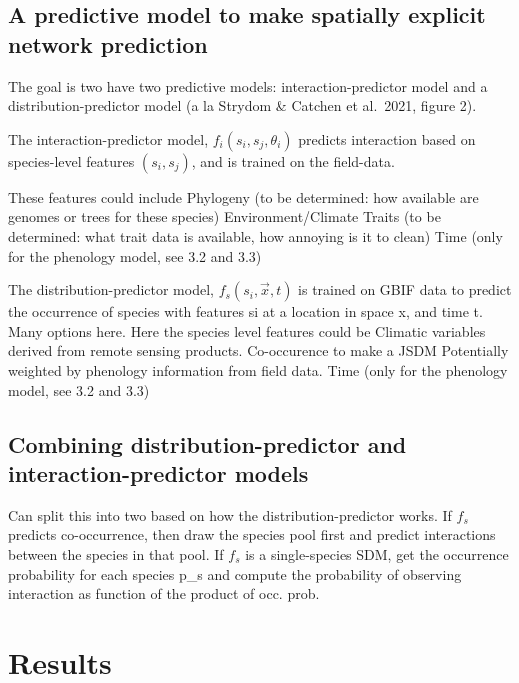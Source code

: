 \documentclass[11pt]{article}
\begin{document}
\hypertarget{a-predictive-model-to-make-spatially-explicit-network-prediction}{%
\subsection{A predictive model to make spatially explicit network
prediction}\label{a-predictive-model-to-make-spatially-explicit-network-prediction}}

The goal is two have two predictive models: interaction-predictor model
and a distribution-predictor model (a la Strydom \& Catchen et al.~2021,
figure 2).

The interaction-predictor model, \(f_i(s_i,s_j, \theta_i)\) predicts
interaction based on species-level features \((s_i, s_j)\), and is
trained on the field-data.

These features could include Phylogeny (to be determined: how available
are genomes or trees for these species) Environment/Climate Traits (to
be determined: what trait data is available, how annoying is it to
clean) Time (only for the phenology model, see 3.2 and 3.3)

The distribution-predictor model, \(f_s(s_i, \vec{x}, t)\) is trained on
GBIF data to predict the occurrence of species with features si at a
location in space x, and time t. Many options here. Here the species
level features could be Climatic variables derived from remote sensing
products. Co-occurence to make a JSDM Potentially weighted by phenology
information from field data. Time (only for the phenology model, see 3.2
and 3.3)

\hypertarget{combining-distribution-predictor-and-interaction-predictor-models}{%
\subsection{Combining distribution-predictor and interaction-predictor
models}\label{combining-distribution-predictor-and-interaction-predictor-models}}

Can split this into two based on how the distribution-predictor works.
If \(f_s\) predicts co-occurrence, then draw the species pool first and
predict interactions between the species in that pool. If \(f_s\) is a
single-species SDM, get the occurrence probability for each species p\_s
and compute the probability of observing interaction as function of the
product of occ. prob.

\hypertarget{results}{%
\section{Results}\label{results}}
\end{document}

